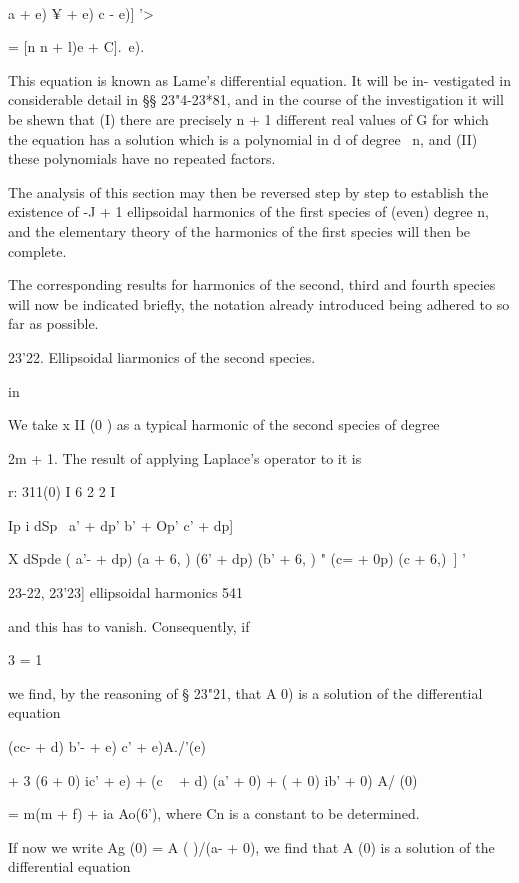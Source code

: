  \ \ {a  + e) ¥ + e) c - e)] '> 



= [n n + l)e + C].\, e). 

This equation is known as Lame's differential equation. It will be in- 
vestigated in considerable detail in §§ 23"4-23*81, and in the course of the 
investigation it will be shewn that (I) there are precisely  n + 1 different 
real values of G for which the equation has a solution which is a polynomial 
in d of degree \ n, and (II) these polynomials have no repeated factors. 

The analysis of this section may then be reversed step by step to establish 
the existence of -J   + 1 ellipsoidal harmonics of the first species of (even) 
degree n, and the elementary theory of the harmonics of the first species will 
then be complete. 

The corresponding results for harmonics of the second, third and fourth 
species will now be indicated briefly, the notation already introduced being 
adhered to so far as possible. 

23'22. Ellipsoidal liarmonics of the second species. 

in 

We take x II (0 ) as a typical harmonic of the second species of degree 

2m + 1. The result of applying Laplace's operator to it is 

r:  311(0) I 6 2 2 I 

 Ip i dSp \ a' + dp'  b' + Op'  c' + dp] 

   X dSpde   ( a'- + dp) (a  + 6, )   (6'  + dp) (b' + 6, ) "  (c= + 0p) (c  + 6,)\ ]  ' 



23-22, 23'23] ellipsoidal harmonics 541 

and this has to vanish. Consequently, if 

3 = 1 

we find, by the reasoning of § 23"21, that A   0) is a solution of the differential 
equation 

(cc- + d) b'- + e) c' + e)A./'(e) 

+    3 (6  + 0) ic' + e) + (c ~ + d) (a' + 0) + (   + 0) ib' + 0)  A/ (0) 

=  m(m + f)  + ia Ao(6'), 
where Cn is a constant to be determined. 

If now we write Ag (0) = A ( )/\/(a- + 0), we find that A (0) is a solution 
of the differential equation 



}
